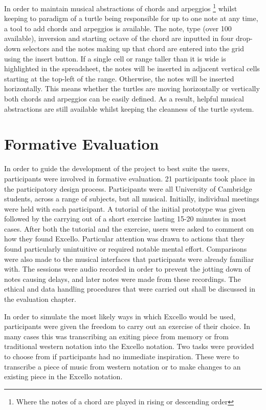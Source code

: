 In order to maintain musical abstractions of chords and arpeggios \footnote{Where the notes of a chord are played in rising or descending order} whilst keeping to paradigm of a turtle being responsible for up to one note at any time, a tool to add chords and arpeggios is available. The note, type (over 100 available), inversion and starting octave of the chord are inputted in four drop-down selectors and the notes making up that chord are entered into the grid using the insert button. If a single cell or range taller than it is wide is highlighted in the spreadsheet, the notes will be inserted in adjacent vertical cells starting at the top-left of the range. Otherwise, the notes will be inserted horizontally. This means whether the turtles are moving horizontally or vertically both chords and arpeggios can be easily defined. As a result, helpful musical abstractions are still available whilst keeping the cleanness of the turtle system.

\section{Formative Evaluation}

In order to guide the development of the project to best suite the users, participants were involved in formative evaluation. 21 participants took place in the participatory design process. Participants were all University of Cambridge students, across a range of subjects, but all musical. Initially, individual meetings were held with each participant. A tutorial of the initial prototype was given followed by the carrying out of a short exercise lasting 15-20 minutes in most cases. After both the tutorial and the exercise, users were asked to comment on how they found Excello. Particular attention was drawn to actions that they found particularly unintuitive or required notable mental effort. Comparisons were also made to the musical interfaces that participants were already familiar with. The sessions were audio recorded in order to prevent the jotting down of notes causing delays, and later notes were made from these recordings. The ethical and data handling procedures that were carried out shall be discussed in the evaluation chapter.

In order to simulate the most likely ways in which Excello would be used, participants were given the freedom to carry out an exercise of their choice. In many cases this was transcribing an exiting piece from memory or from traditional western notation into the Excello notation. Two tasks were provided to choose from if participants had no immediate inspiration. These were to transcribe a piece of music from western notation or to make changes to an existing piece in the Excello notation.

